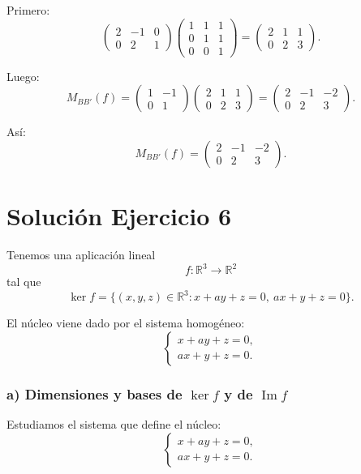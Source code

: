 \documentclass[12pt]{article}
\begin{document}
Primero:
\[
\begin{pmatrix}
2&-1&0\\
0&2&1
\end{pmatrix}
\begin{pmatrix}
1&1&1\\
0&1&1\\
0&0&1
\end{pmatrix}
=
\begin{pmatrix}
2&1&1\\
0&2&3
\end{pmatrix}.
\]

Luego:
\[
M_{BB'}(f)
=
\begin{pmatrix}
1&-1\\
0&1
\end{pmatrix}
\begin{pmatrix}
2&1&1\\
0&2&3
\end{pmatrix}
=
\begin{pmatrix}
2&-1&-2\\
0&2&3
\end{pmatrix}.
\]

Así:
\[
\boxed{
M_{BB'}(f)=
\begin{pmatrix}
2&-1&-2\\
0&2&3
\end{pmatrix}.
}
\]

\section*{Solución Ejercicio 6}

Tenemos una aplicación lineal
\[
f:\mathbb{R}^3\longrightarrow \mathbb{R}^2
\]
tal que
\[
\ker f=\{(x,y,z)\in\mathbb{R}^3:x+ay+z=0,\ ax+y+z=0\}.
\]

El núcleo viene dado por el sistema homogéneo:
\[
\begin{cases}
x+ay+z=0,\\
ax+y+z=0.
\end{cases}
\]

\subsubsection*{a) Dimensiones y bases de \(\ker f\) y de \(\operatorname{Im} f\)}

Estudiamos el sistema que define el núcleo:
\[
\begin{cases}
x+ay+z=0,\\
ax+y+z=0.
\end{cases}
\]
\end{document}
